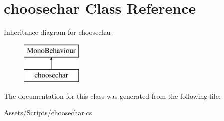 \hypertarget{classchoosechar}{}\section{choosechar Class Reference}
\label{classchoosechar}
Inheritance diagram for choosechar\+:\begin{figure}[H]
\begin{center}
\leavevmode
\includegraphics[height=2.000000cm]{classchoosechar}
\end{center}
\end{figure}


The documentation for this class was generated from the following file\+:\begin{DoxyCompactItemize}
\item 
Assets/\+Scripts/choosechar.\+cs\end{DoxyCompactItemize}
